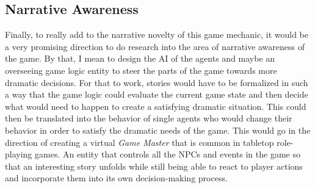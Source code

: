 \subsection{Narrative Awareness}
Finally, to really add to the narrative novelty of this game mechanic, it would be a very promising direction to do research into the area of narrative awareness of the game. By that, I mean to design the AI of the agents and maybe an overseeing game logic entity to steer the parts of the game towards more dramatic decisions. For that to work, stories would have to be formalized in such a way that the game logic could evaluate the current game state and then decide what would need to happen to create a satisfying dramatic situation. This could then be translated into the behavior of single agents who would change their behavior in order to satisfy the dramatic needs of the game. This would go in the direction of creating a virtual \textit{Game Master} that is common in tabletop role-playing games. An entity that controls all the NPCs and events in the game so that an interesting story unfolds while still being able to react to player actions and incorporate them into its own decision-making process.